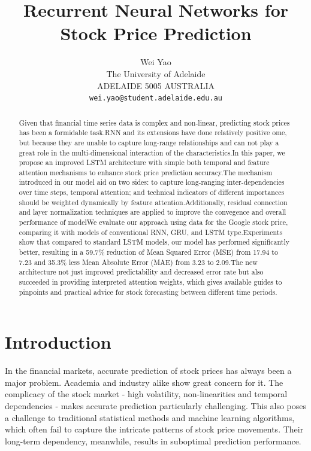 \documentclass[10pt,twocolumn,letterpaper]{article}
\begin{document}
\title{Recurrent Neural Networks for Stock Price Prediction}

\author{Wei Yao\\
The University of Adelaide\\
ADELAIDE 5005 AUSTRALIA\\
{\tt\small wei.yao@student.adelaide.edu.au}
}
\maketitle


\begin{abstract}
	Given that financial time series data is complex and non-linear, predicting stock prices has been a formidable task.RNN and its extensions have done relatively positive ome, but because they are unable to capture long-range relationships and can not play a great role in the multi-dimensional interaction of the characteristics.In this paper, we propose an improved LSTM architecture with simple both  temporal and feature attention mechanisms to enhance stock price prediction accuracy.The mechanism introduced in our model aid on two sides: to capture long-ranging inter-dependencies over time steps, temporal attention; and technical indicators of different importances should be weighted dynamically by feature attention.Additionally, residual connection and layer normalization techniques are applied to improve the convegence and overall performance of modelWe evaluate our approach using data for the Google stock price, comparing it with models of conventional RNN, GRU, and LSTM type.Experiments show that compared to standard LSTM models, our model has performed significantly better, resulting in a 59.7\% reduction of Mean Squared Error (MSE) from 17.94 to 7.23 and 35.3\% less Mean Absolute Error (MAE) from 3.23 to 2.09.The new architecture not just improved predictability and decreased error rate but also succeeded in providing interpreted attention weights, which gives available guides to pinpoints and practical advice for stock forecasting between different time periods.
\end{abstract}

\section{Introduction}
In the financial markets, accurate prediction of stock prices has always been a major problem. Academia and industry alike show great concern for it. The complicacy of the stock market - high volatility, non-linearities and temporal dependencies - makes accurate prediction particularly challenging. This also poses a challenge to traditional statistical methods and machine learning algorithms, which often fail to capture the intricate patterns of stock price movements. Their long-term dependency, meanwhile, results in suboptimal prediction performance.
\end{document}
